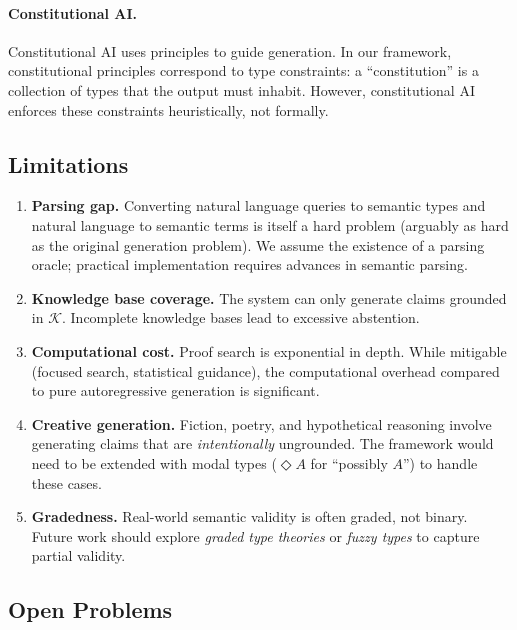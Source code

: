 \documentclass[11pt,a4paper]{article}
\theoremstyle{plain}
\theoremstyle{definition}
\theoremstyle{remark}
\begin{document}
\paragraph{Constitutional AI.}
Constitutional AI \cite{bai2022constitutional} uses principles to guide generation.
In our framework, constitutional principles correspond to type constraints: a ``constitution'' is a collection of types that the output must inhabit.
However, constitutional AI enforces these constraints heuristically, not formally.

\subsection{Limitations}

\begin{enumerate}[nosep]
  \item \textbf{Parsing gap.} Converting natural language queries to semantic types and natural language to semantic terms is itself a hard problem (arguably as hard as the original generation problem).
  We assume the existence of a parsing oracle; practical implementation requires advances in semantic parsing.

  \item \textbf{Knowledge base coverage.} The system can only generate claims grounded in $\mathcal{K}$.
  Incomplete knowledge bases lead to excessive abstention.

  \item \textbf{Computational cost.} Proof search is exponential in depth.
  While mitigable (focused search, statistical guidance), the computational overhead compared to pure autoregressive generation is significant.

  \item \textbf{Creative generation.} Fiction, poetry, and hypothetical reasoning involve generating claims that are \emph{intentionally} ungrounded.
  The framework would need to be extended with modal types ($\Diamond A$ for ``possibly $A$'') to handle these cases.

  \item \textbf{Gradedness.} Real-world semantic validity is often graded, not binary.
  Future work should explore \emph{graded type theories} or \emph{fuzzy types} to capture partial validity.
\end{enumerate}

\subsection{Open Problems}
\end{document}
